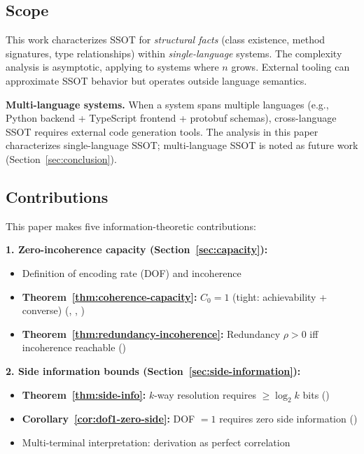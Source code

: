 \subsection{Scope}\label{sec:scope}

This work characterizes SSOT for \emph{structural facts} (class existence, method signatures, type relationships) within \emph{single-language} systems. The complexity analysis is asymptotic, applying to systems where $n$ grows. External tooling can approximate SSOT behavior but operates outside language semantics.

\textbf{Multi-language systems.} When a system spans multiple languages (e.g., Python backend + TypeScript frontend + protobuf schemas), cross-language SSOT requires external code generation tools. The analysis in this paper characterizes single-language SSOT; multi-language SSOT is noted as future work (Section~\ref{sec:conclusion}).

\subsection{Contributions}\label{sec:contributions}

This paper makes five information-theoretic contributions:

\textbf{1. Zero-incoherence capacity (Section~\ref{sec:capacity}):}
\begin{itemize}
\tightlist
\item Definition of encoding rate (DOF) and incoherence
\item \textbf{Theorem~\ref{thm:coherence-capacity}:} $C_0 = 1$ (tight: achievability + converse) (, , )
\item \textbf{Theorem~\ref{thm:redundancy-incoherence}:} Redundancy $\rho > 0$ iff incoherence reachable ()
\end{itemize}

\textbf{2. Side information bounds (Section~\ref{sec:side-information}):}
\begin{itemize}
\tightlist
\item \textbf{Theorem~\ref{thm:side-info}:} $k$-way resolution requires $\geq \log_2 k$ bits ()
\item \textbf{Corollary~\ref{cor:dof1-zero-side}:} DOF $= 1$ requires zero side information ()
\item Multi-terminal interpretation: derivation as perfect correlation
\end{itemize}

